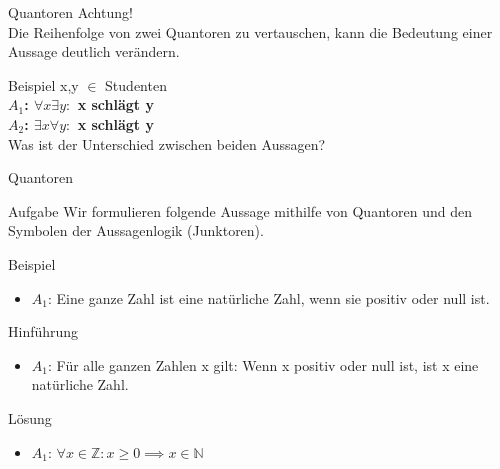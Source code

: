 \documentclass[10pt]{beamer}
\begin{document}
\begin{frame}[fragile]{Quantoren}
    \alert{Achtung!}\\
    Die Reihenfolge von zwei Quantoren zu vertauschen, kann die Bedeutung einer Aussage deutlich verändern.
    \begin{exampleblock}{Beispiel}
        x,y $\in$ Studenten\\
        \textbf{$A_1$: $\forall x \exists y:$ x schlägt y\\
        $A_2$: $\exists x \forall y:$ x schlägt y\\ }
        Was ist der Unterschied zwischen beiden Aussagen?
    \end{exampleblock}
\end{frame}

\begin{frame}{Quantoren}
    \begin{alertblock}{Aufgabe}
      Wir formulieren folgende Aussage mithilfe von Quantoren und den Symbolen der Aussagenlogik (Junktoren).
    \end{alertblock}
    \begin{block}{Beispiel}
    \begin{itemize}
        \item $A_1$: Eine ganze Zahl ist eine natürliche Zahl, wenn sie positiv oder null ist.
    \end{itemize}
    \end{block}
    \begin{block}{Hinführung}
    \begin{itemize}
        \item $A_1$: Für alle ganzen Zahlen x gilt: Wenn x positiv oder null ist, ist x eine natürliche Zahl.
    \end{itemize}
    \end{block}
    \begin{block}{\alert{Lösung}}
    \begin{itemize}
        \item $A_1$: $\forall x \in \mathbb{Z}: x \geq 0 \implies x \in \mathbb{N}$
    \end{itemize}
    \end{block}
\end{frame}
\end{document}
